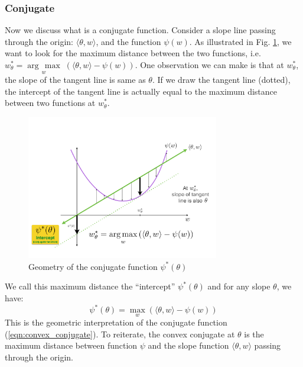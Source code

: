 \documentclass[11pt]{article}
\newcommand{\argmax}[1]{\underset{#1}{\operatorname{arg}\,\operatorname{max}}\;}
\begin{document}
\subsubsection{Conjugate}

Now we discuss what is a conjugate function. Consider a slope line passing through the origin: $\langle \theta, w \rangle$, and the function $\psi(w)$. As illustrated in Fig. \ref{fig:geo_conjugate}, we want to look for the maximum distance between the two functions, i.e. $w_\theta^* = \argmax{w}(\langle \theta, w \rangle - \psi(w))$. One observation we can make is that at $w_\theta^*$, the slope of the tangent line is same as $\theta$. If we draw the tangent line (dotted), the intercept of the tangent line is actually equal to the maximum distance between two functions at $w_\theta^*$.

\begin{figure}[h]
    \centering
    \includegraphics[width=0.75\textwidth]{figures/geom_conjugate.pdf}
    \caption{Geometry of the conjugate function $\psi^*(\theta)$}
    \label{fig:geo_conjugate}
\end{figure}

We call this maximum distance the ``intercept'' $\psi^*(\theta)$ and for any slope $\theta$, we have:
\begin{equation}
    \label{eqn:conjugate_function}
    \psi^*(\theta) = \max_w (\langle \theta, w \rangle - \psi(w))
\end{equation}
This is the geometric interpretation of the conjugate function (\ref{eqn:convex_conjugate}). To reiterate, the convex conjugate at $\theta$ is the maximum distance between function $\psi$ and the slope function $\langle \theta, w \rangle$ passing through the origin.
\end{document}
